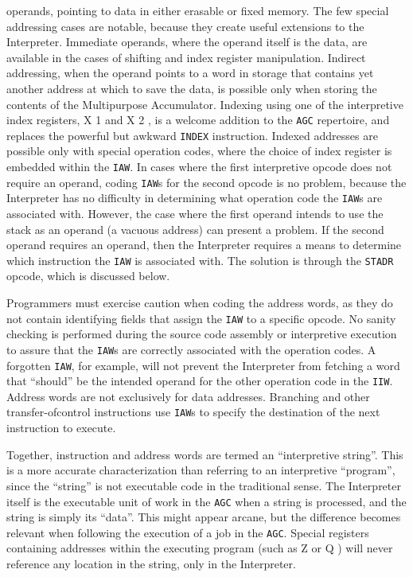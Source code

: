 \documentclass[refcap, oxford]{ahsan}
\begin{document}
operands, pointing to data in either erasable or fixed memory. The few special addressing cases are notable, because they create useful extensions to the Interpreter. Immediate operands, where the operand itself is the data, are available in the cases of shifting and index register manipulation. Indirect addressing, when the operand points to a word in storage that contains yet another address at which to save the data, is possible only when storing the contents of the Multipurpose Accumulator. Indexing using one of the interpretive index registers, X 1 and X 2 , is a welcome addition to the \texttt{AGC} repertoire, and replaces the powerful but awkward \texttt{INDEX} instruction. Indexed addresses are possible only with special operation codes, where the choice of index register is embedded within the \texttt{IAW}. In cases where the first interpretive opcode does not require an operand, coding \texttt{IAW}s for the second opcode is no problem, because the Interpreter has no difficulty in determining what operation code the \texttt{IAW}s are associated with. However, the case where the first operand intends to use the stack as an operand (a vacuous address) can present a problem. If the second operand requires an operand, then the Interpreter requires a means to determine which instruction the \texttt{IAW} is associated with. The solution is through the \texttt{STADR} opcode, which is discussed below.

Programmers must exercise caution when coding the address words, as they do not contain identifying fields that assign the \texttt{IAW} to a specific opcode. No sanity checking is performed during the source code assembly or interpretive execution to assure that the \texttt{IAW}s are correctly associated with the operation codes. A forgotten \texttt{IAW}, for example, will not prevent the Interpreter from fetching a word that ``should'' be the intended operand for the other operation code in the \texttt{IIW}. Address words are not exclusively for data addresses. Branching and other transfer-ofcontrol instructions use \texttt{IAW}s to specify the destination of the next instruction to execute.

Together, instruction and address words are termed an ``interpretive string''. This is a more accurate characterization than referring to an interpretive ``program'', since the ``string'' is not executable code in the traditional sense. The Interpreter itself is the executable unit of work in the \texttt{AGC} when a string is processed, and the string is simply its ``data''. This might appear arcane, but the difference becomes relevant when following the execution of a job in the \texttt{AGC}. Special registers containing addresses within the executing program (such as Z or Q ) will never reference any location in the string, only in the Interpreter.
\end{document}
